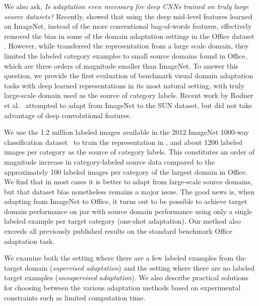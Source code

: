 We also ask, \textit{Is adaptation even necessary for deep CNNs trained on truly large source datasets?}
Recently, \cite{deeplearning-arxiv-2013} showed that using the deep mid-level features learned on ImageNet, instead of the more conventional bag-of-words features, effectively removed the bias in some of the domain adaptation settings in the Office dataset \cite{saenko-eccv10}.
However, while \cite{deeplearning-arxiv-2013} transferred the representation from a large scale domain, they limited the labeled category examples to small source domains found in Office, 
which are three orders of magnitude smaller than ImageNet. 
To answer this question, we provide the first evaluation of benchmark visual domain adaptation tasks with deep learned representations in its most natural setting, with truly large-scale domain used as the source of category labels.
Recent work by Rodner et al.~\cite{rodner-arxiv13} attempted to adapt from ImageNet to the SUN dataset, but did not take advantage of deep convolutional features. 

We use the 1.2 million
labeled images available in the 2012 ImageNet 1000-way classification
dataset~\cite{ilsvrc2012} to train the representation in \cite{supervision}, and about 1200 labeled images per category as the source of category labels.
This constitutes an order of magnitude increase in category-labeled source data compared to the approximately 100 labeled images per category of the largest domain in Office.  We find that in most cases it is better to adapt from large-scale source domains, but that dataset bias nonetheless remains a major issue.
The good news is, when adapting
from ImageNet to Office, it turns out to be possible to achieve target domain
performance on par with source domain performance using only a single labeled
example per target category (one-shot adaptation).  Our method also exceeds all previously published
results on the standard benchmark Office adaptation task.

We examine both the setting where there are a few labeled examples from the target domain (\emph{supervised adaptation}) and the setting where there are no labeled target examples (\emph{unsupervised adaptation}). We also describe practical solutions for choosing between the various adaptation methods based on experimental constraints such as limited computation time. 
